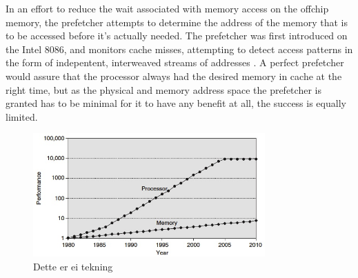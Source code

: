 In an effort to reduce the wait associated with memory access on the offchip memory, the prefetcher attempts to determine the address of the memory that is to be accessed before it's actually needed. The prefetcher was first introduced on the Intel 8086, and monitors cache misses, attempting to detect access patterns in the form of indepentent, interweaved streams of addresses \cite{reference:8086}. A perfect prefetcher would assure that the processor always had the desired memory in cache at the right time, but as the physical and memory address space the prefetcher is granted has to be minimal for it to have any benefit at all, the success is equally limited. 
\\
\begin{figure}[h!]
	\includegraphics[width=3.5in]{graphics/CPUmemoryGap.jpg}
	\caption{Dette er ei tekning}
\end{figure}
\\

